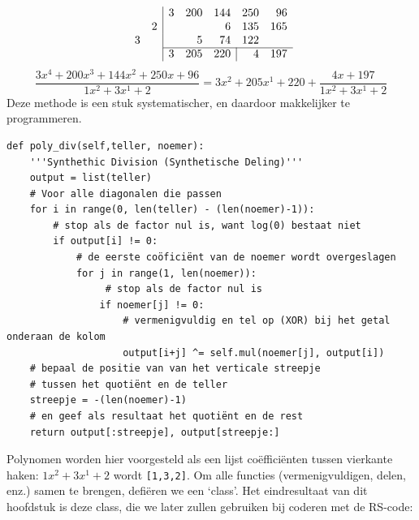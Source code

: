 \documentclass{article}
\begin{document}
\[\begin{array}{rr|rrrrr}
&&3&200&144&250&96\\
&2&&&6&135&165\\
3&&&5&74&122\\\cline{3-7}
&&3&205&\multicolumn{1}{r|}{220}&4&197
\end{array}\]
$$\frac{
3x^4+200x^3+144x^2+250x+96
}{
1x^2 + 3x^1 + 2
} = 3x^2 + 205x^1 + 220 + \frac{4x+197}{1x^2 + 3x^1 + 2}
$$
Deze methode is een stuk systematischer, en daardoor makkelijker te programmeren.
\begin{verbatim}
def poly_div(self,teller, noemer):
    '''Synthethic Division (Synthetische Deling)'''
    output = list(teller)
    # Voor alle diagonalen die passen
    for i in range(0, len(teller) - (len(noemer)-1)):
        # stop als de factor nul is, want log(0) bestaat niet
        if output[i] != 0:
            # de eerste coöficiënt van de noemer wordt overgeslagen
            for j in range(1, len(noemer)):
                 # stop als de factor nul is
                if noemer[j] != 0:
                    # vermenigvuldig en tel op (XOR) bij het getal onderaan de kolom
                    output[i+j] ^= self.mul(noemer[j], output[i])
    # bepaal de positie van van het verticale streepje
    # tussen het quotiënt en de teller
    streepje = -(len(noemer)-1)
    # en geef als resultaat het quotiënt en de rest
    return output[:streepje], output[streepje:]
\end{verbatim}
Polynomen worden hier voorgesteld als een lijst coëfficiënten tussen vierkante haken: $1x^2 + 3x^1 + 2$ wordt \texttt{[1,3,2]}. Om alle functies (vermenigvuldigen, delen, enz.) samen te brengen, defiëren we een `class'. Het eindresultaat van dit hoofdstuk is deze class, die we later zullen gebruiken bij coderen met de RS-code:
\end{document}
